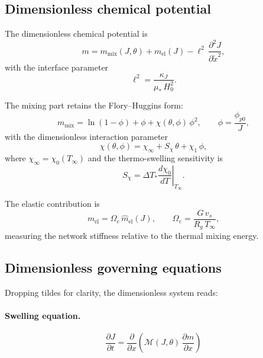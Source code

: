 \documentclass[aps,pre,reprint,superscriptaddress,longbibliography,floatfix]{revtex4-2}
\newcommand{\Ms}{\mathcal{M}}
\newcommand{\pp}{\phi_{p0}}
\begin{document}
\subsection{Dimensionless chemical potential}

The dimensionless chemical potential is
\begin{equation}
  m = m_\mathrm{mix}(J,\theta) + m_\mathrm{el}(J) - \ell^2\,\frac{\partial^2 J}{\partial \tilde{x}^2},
  \label{eq:m_nondim}
\end{equation}
with the interface parameter
\begin{equation}
  \ell^2 = \frac{\kappa_J}{\mu_*\,H_0^2}.
\end{equation}

The mixing part retains the Flory--Huggins form:
\begin{equation}
  m_\mathrm{mix} = \ln(1-\phi) + \phi + \chi(\theta,\phi)\,\phi^2,
  \qquad \phi = \frac{\pp}{J},
  \label{eq:m_mix}
\end{equation}
with the dimensionless interaction parameter
\begin{equation}
  \chi(\theta,\phi) = \chi_\infty + S_\chi\,\theta + \chi_1\,\phi,
  \label{eq:chi_nondim}
\end{equation}
where $\chi_\infty = \chi_0(T_\infty)$ and the thermo-swelling sensitivity is
\begin{equation}
  S_\chi = \Delta T_*\left.\frac{d\chi_0}{dT}\right|_{T_\infty}.
  \label{eq:Schi}
\end{equation}

The elastic contribution is
\begin{equation}
  m_\mathrm{el} = \Omega_e\,\widehat{m}_\mathrm{el}(J),
  \qquad
  \Omega_e = \frac{G\,v_s}{R_g\,T_\infty},
\end{equation}
measuring the network stiffness relative to the thermal mixing energy.

\subsection{Dimensionless governing equations}

Dropping tildes for clarity, the dimensionless system reads:

\paragraph{Swelling equation.}
\begin{equation}
  \boxed{
  \frac{\partial J}{\partial t}
  = \frac{\partial}{\partial x}\!\left(\Ms(J,\theta)\,\frac{\partial m}{\partial x}\right)
  }
  \label{eq:J_nondim}
\end{equation}
\end{document}
